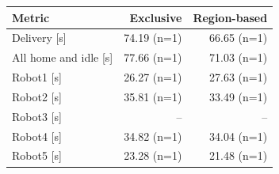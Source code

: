 \begin{tabular}{@{}lrr@{}}
\toprule
Metric & Exclusive & Region-based \\
\midrule
Delivery [s] & 74.19 (n=1) & 66.65 (n=1) \\
All home and idle [s] & 77.66 (n=1) & 71.03 (n=1) \\
Robot1 [s] & 26.27 (n=1) & 27.63 (n=1) \\
Robot2 [s] & 35.81 (n=1) & 33.49 (n=1) \\
Robot3 [s] & -- & -- \\
Robot4 [s] & 34.82 (n=1) & 34.04 (n=1) \\
Robot5 [s] & 23.28 (n=1) & 21.48 (n=1) \\
\bottomrule
\end{tabular}
